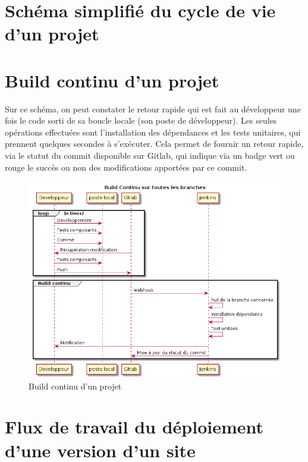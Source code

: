 \section{Schéma simplifié du cycle de vie d'un projet}

\clearpage
\section{Build continu d'un projet \naq}

{\normalsize Sur ce schéma, on peut constater le retour rapide qui est fait au développeur une fois le code sorti de sa boucle locale (son poste de développeur). Les seules opérations effectuées sont l'installation des dépendances et les tests unitaires, qui prennent quelques secondes à s'exécuter. Cela permet de fournir un retour rapide, via le statut du commit disponible sur Gitlab, qui indique via un badge vert ou rouge le succès ou non des modifications apportées par ce commit.}

\begin{figure}[ht]
	\centering
	\includegraphics[scale=0.6,angle=-90]{img/build-continu.png}
	\caption{Build continu d'un projet \naq}
	\label{annexe:build-continu}
\end{figure}

\clearpage
\section{Flux de travail du déploiement d'une version d'un site \naq}


